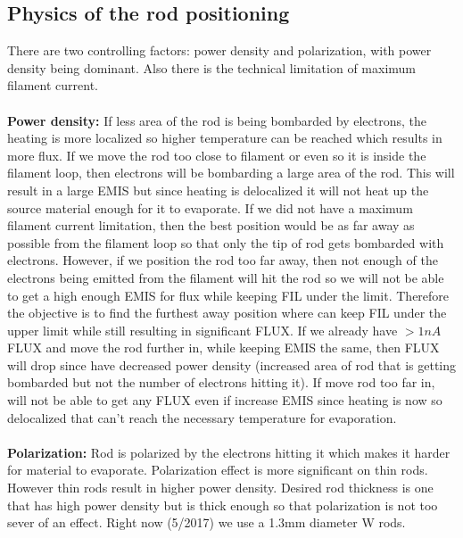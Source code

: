 \subsection{Physics of the rod positioning}
There are two controlling factors: power density and polarization, with power density being dominant. Also there is the technical limitation of maximum filament current.\\\\
\textbf{Power density:} 
If less area of the rod is being bombarded by electrons, the heating is more localized so higher temperature can be reached which results in more flux. If we move the rod too close to filament or even so it is inside the filament loop, then electrons will be bombarding a large area of the rod. This will result in a large EMIS but since heating is delocalized it will not heat up the source material enough for it to evaporate. If we did not have a maximum filament current limitation, then the best position would be as far away as possible from the filament loop so that only the tip of rod gets bombarded with electrons. However, if we position the rod too far away, then not enough of the electrons being emitted from the filament will hit the rod so we will not be able to get a high enough EMIS for flux while keeping FIL under the limit.  Therefore the objective is to find the furthest away position where can keep FIL under the upper limit while still resulting in significant FLUX. If we already have $>1nA$ FLUX and move the rod further in, while keeping EMIS the same, then FLUX will drop since have decreased power density (increased area of rod that is getting bombarded but not the number of electrons hitting it). If move rod too far in, will not be able to get any FLUX even if increase EMIS since heating is now so delocalized that can’t reach the necessary temperature for evaporation.\\\\
\textbf{Polarization:} 
Rod is polarized by the electrons hitting it which makes it harder for material to evaporate. Polarization effect is more significant on thin rods. However thin rods result in higher power density. Desired rod thickness is one that has high power density but is thick enough so that polarization is not too sever of an effect. Right now (5/2017) we use a 1.3mm diameter W rods.



